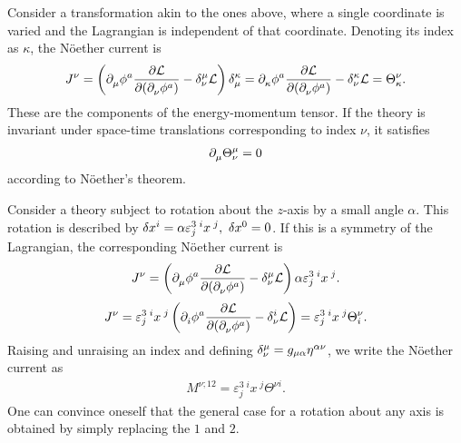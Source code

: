 Consider a transformation akin to the ones above, where a single coordinate is varied and the Lagrangian is independent of that coordinate. Denoting its index as $\kappa$, the Nöether current is
\begin{align*}
	J^{\nu} = \left(\del{}{\mu}{\phi^{a}}\pdv{\lag}{(\del{}{\nu}{\phi^{a}})} - \kdelta{\mu}{\nu}\lag\right)\kdelta{\kappa}{\mu} = \del{}{\kappa}{\phi^{a}}\pdv{\lag}{(\del{}{\nu}{\phi^{a}})} - \kdelta{\kappa}{\nu}\lag = \Theta_{\kappa}^{\nu}.
\end{align*}
These are the components of the energy-momentum tensor. If the theory is invariant under space-time translations corresponding to index $\nu$, it satisfies
\begin{align*}
	\partial^{}_{\mu}{\Theta_{\nu}^{\mu}} = 0
\end{align*}
according to Nöether's theorem.

Consider a theory subject to rotation about the $z$-axis by a small angle $\alpha$. This rotation is described by $\var{x^{i}} = \alpha\varepsilon^{3\;i}_{j}x^{\;j},\ \var{x^{0}} = 0$. If this is a symmetry of the Lagrangian, the corresponding Nöether current is
\begin{align*}
	J^{\nu} = \left(\del{}{\mu}{\phi^{a}}\pdv{\lag}{(\del{}{\nu}{\phi^{a}})} - \kdelta{\mu}{\nu}\lag\right) \alpha\varepsilon^{3\;i}_{j}x^{\;j}.
\end{align*}
\begin{align*}
	J^{\nu} = \varepsilon^{3\;i}_{j}x^{\;j}\left(\del{}{i}{\phi^{a}}\pdv{\lag}{(\del{}{\nu}{\phi^{a}})} - \kdelta{i}{\nu}\lag\right) = \varepsilon^{3\;i}_{j}x^{\;j}\Theta_{i}^{\nu}.
\end{align*}
Raising and unraising an index and defining $\kdelta{\mu}{\nu} = g_{\mu\alpha}\eta^{\alpha\nu}$, we write the Nöether current as
\begin{align*}
	M^{\nu;12} = \varepsilon^{3\;i}_{j}x^{\;j}\Theta^{\nu i}.
\end{align*}
One can convince oneself that the general case for a rotation about any axis is obtained by simply replacing the $1$ and $2$.

